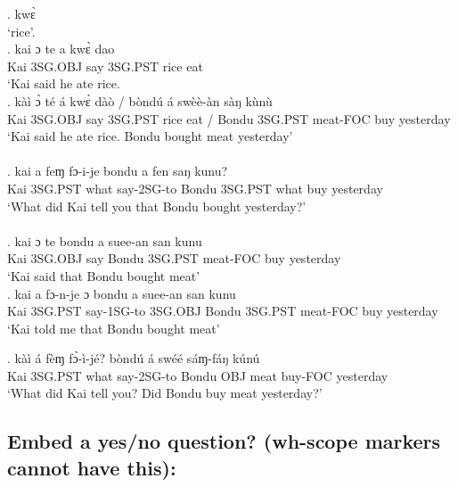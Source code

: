 \documentclass{assets/fieldnotes}
\begin{document}
\exg. kwɛ̀\\
`rice'.\\

\exg. kai ɔ te a kwɛ̀ dao \\
Kai 3SG.OBJ say 3SG.PST rice eat   \\
`Kai said he ate rice.\\

\exg.  kàì ɔ̀ té á kwɛ̀ dàò / bòndú á swèè-àn sàŋ kùnù\\
Kai 3SG.OBJ say 3SG.PST rice eat / Bondu 3SG.PST meat-FOC buy yesterday\\
`Kai said he ate rice. Bondu bought meat yesterday'\\

\\

\exg. kai a feɱ fɔ-i-je bondu a fen saŋ kunu?\\
Kai 3SG.PST what say-2SG-to Bondu 3SG.PST what buy yesterday\\
`What did Kai tell you that Bondu bought yesterday?' \\

\\

\exg. kai ɔ te bondu a suee-an san kunu\\
Kai 3SG.OBJ say Bondu 3SG.PST meat-FOC buy yesterday\\
`Kai said that Bondu bought meat' \\

\exg. kai a fɔ-n-je ɔ bondu a suee-an san kunu\\
Kai 3SG.PST say-1SG-to 3SG.OBJ Bondu 3SG.PST meat-FOC buy yesterday\\
`Kai told me that Bondu bought meat' \\




\exg. kàì á fèɱ fɔ̀-ì-jé? bòndú á swéé sáɱ-fáŋ kúnú\\
Kai 3SG.PST what say-2SG-to Bondu OBJ meat buy-FOC yesterday\\
`What did Kai tell you? Did Bondu buy meat yesterday?' \\

\subsection{Embed a yes/no question? (wh-scope markers cannot have this):}
\end{document}
